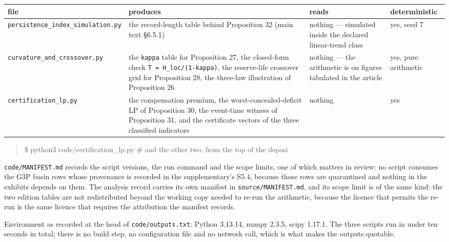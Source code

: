 \documentclass[11pt]{article}
\begin{document}
\begin{longtable}{@{}l|p{50mm}|p{50mm}|l@{}}
\toprule
file & produces & reads & deterministic \\
\midrule
\texttt{persistence\_index\_simulation.py} & the record-length table behind Proposition 32 (main text \S6.5.1) & nothing --- simulated inside the declared linear-trend class & yes, seed 7 \\
\texttt{curvature\_and\_crossover.py} & the \texttt{kappa} table for Proposition 27, the closed-form check \texttt{T = H\_loc/(1-kappa)}, the reserve-life crossover grid for Proposition 28, the three-law illustration of Proposition 26 & nothing --- the arithmetic is on figures tabulated in the article & yes, pure arithmetic \\
\texttt{certification\_lp.py} & the compensation premium, the worst-concealed-deficit LP of Proposition 30, the event-time witness of Proposition 31, and the certificate vectors of the three classified indicators & nothing & yes \\
\bottomrule
\end{longtable}

\begin{quote}\ttfamily\footnotesize\raggedright\setlength{\parskip}{0pt}
\$ python3 code/certification\_lp.py \# and the other two, from the top of the deposi
\end{quote}

\texttt{code/MANIFEST.md} records the script versions, the run command and the scope limits, one of which matters in review: no script consumes the G3P basin rows whose provenance is recorded in the supplementary's S5.4, because those rows are quarantined and nothing in the exhibits depends on them. The analysis record carries its own manifest in \texttt{source/MANIFEST.md}, and its scope limit is of the same kind: the two edition tables are not redistributed beyond the working copy needed to re-run the arithmetic, because the licence that permits the re-run is the same licence that requires the attribution the manifest records.

Environment as recorded at the head of \texttt{code/outputs.txt}: Python 3.13.14, numpy 2.3.5, scipy 1.17.1. The three scripts run in under ten seconds in total; there is no build step, no configuration file and no network call, which is what makes the outputs quotable.
\end{document}
